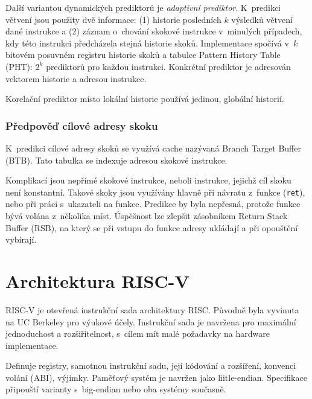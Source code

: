 Další variantou dynamických prediktorů je \emph{adaptivní prediktor}.
K~predikci větvení jsou použity dvě informace: (1) historie posledních $k$ výsledků větvení dané instrukce a (2) záznam o~chování skokové instrukce v~minulých případech, kdy této instrukci předcházela stejná historie skoků.
Implementace spočívá v~$k$ bitovém posuvném registru historie skoků a tabulce Pattern History Table (PHT): $2^k$ prediktorů pro každou instrukci.
Konkrétní prediktor je adresován vektorem historie a adresou instrukce. \cite{adaptiveBranch}

Korelační prediktor místo lokální historie používá jedinou, globální historií.

\subsection{Předpověď cílové adresy skoku}

K~predikci cílové adresy skoků se využívá cache nazývaná Branch Target Buffer (BTB).
Tato tabulka se indexuje adresou skokové instrukce.

Komplikací jsou nepřímé skokové instrukce, neboli instrukce, jejichž cíl skoku není konstantní.
Takové skoky jsou využívány hlavně při návratu z~funkce (\texttt{ret}), nebo při práci s~ukazateli na funkce.
Predikce by byla nepřesná, protože funkce bývá volána z~několika míst.
Úspěšnost lze zlepšit zásobníkem Return Stack Buffer (RSB), na který se při vstupu do funkce adresy ukládají a při opouštění vybírají.


\chapter{Architektura RISC-V}
\label{riscvchapter}

RISC-V je otevřená instrukční sada architektury RISC.
Původně byla vyvinuta na UC Berkeley pro výukové účely.
Instrukční sada je navržena pro maximální jednoduchost a rozšiřitelnost, s~cílem mít malé požadavky na hardware implementace.
\cite{riscvspec}

Definuje registry, samotnou instrukční sadu, její kódování a rozšíření, konvenci volání (ABI), výjimky.
Paměťový systém je navržen jako liitle-endian.
Specifikace připouští varianty s~big-endian nebo oba systémy současně.

